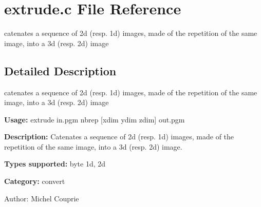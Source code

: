 \section{extrude.c File Reference}
\label{extrude_8c}
catenates a sequence of 2d (resp. 1d) images, made of the repetition of the same image, into a 3d (resp. 2d) image 



\subsection{Detailed Description}
catenates a sequence of 2d (resp. 1d) images, made of the repetition of the same image, into a 3d (resp. 2d) image 

{\bf Usage:} extrude in.pgm nbrep [xdim ydim zdim] out.pgm

{\bf Description:} Catenates a sequence of 2d (resp. 1d) images, made of the repetition of the same image, into a 3d (resp. 2d) image.

{\bf Types supported:} byte 1d, 2d

{\bf Category:} convert

\begin{Desc}
\item[Author:]Michel Couprie \end{Desc}
